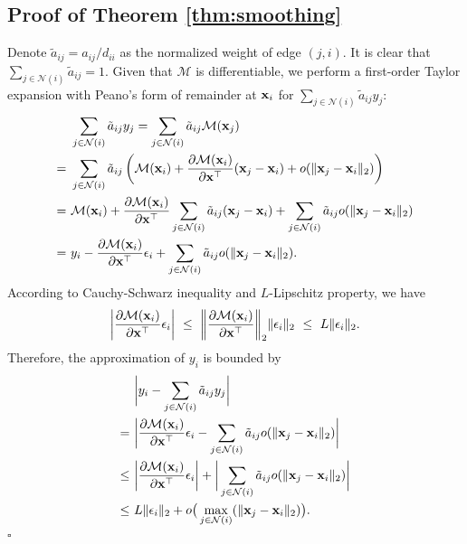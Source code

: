 \documentclass{article}
\newenvironment{proof}{{\noindent\it Proof.}\quad}{\hfill $\square$\par}
\begin{document}
	\subsection{Proof of Theorem \ref{thm:smoothing}}
	\label{app:a}
		\begin{proof}
			Denote $\tilde a_{ij} = a_{ij} / d_{ii}$ as the normalized weight of edge $(j, i)$.
			It is clear that $\sum_{j \in \mathcal N(i)} \tilde a_{ij} = 1$.
			Given that $\mathcal M$ is differentiable, we perform a first-order Taylor expansion with Peano's form of remainder at ${\bf x}_i$ for $\sum_{j \in \mathcal N(i)} \tilde a_{ij} y_j$:
			\begin{equation}
			\begin{split}
				& \sum_{j \in \mathcal N(i)} \tilde a_{ij} y_j = \sum_{j \in \mathcal N(i)} \tilde a_{ij} \mathcal M({\bf x}_j) \\
				= \ & \sum_{j \in \mathcal N(i)} \tilde a_{ij} \left( \mathcal M({\bf x}_i) + \frac{\partial \mathcal M({\bf x}_i)}{\partial {\bf x}^\top} ({\bf x}_j - {\bf x}_i) + o(\| {\bf x}_j - {\bf x}_i \|_2) \right) \\
				= \ & \mathcal M({\bf x}_i) + \frac{\partial \mathcal M({\bf x}_i)}{\partial {\bf x}^\top} \sum_{j \in \mathcal N(i)} \tilde a_{ij} ({\bf x}_j - {\bf x}_i) + \sum_{j \in \mathcal N(i)} \tilde a_{ij} o(\| {\bf x}_j - {\bf x}_i \|_2) \\
				= \ & y_i - \frac{\partial \mathcal M({\bf x}_i)}{\partial {\bf x}^\top} \epsilon_i + \sum_{j \in \mathcal N(i)} \tilde a_{ij} o(\| {\bf x}_j - {\bf x}_i \|_2).
			\end{split}
			\end{equation}
			According to Cauchy-Schwarz inequality and $L$-Lipschitz property, we have
			\begin{equation}
				\bigg| \frac{\partial \mathcal M({\bf x}_i)}{\partial {\bf x}^\top} \epsilon_i \bigg| \ \leq \ \bigg\| \frac{\partial \mathcal M({\bf x}_i)}{\partial {\bf x}^\top} \bigg\|_2 \| \epsilon_i \|_2 \ \leq \ L \| \epsilon_i \|_2.
			\end{equation}
			Therefore, the approximation of $y_i$ is bounded by
			\begin{equation}
			\begin{split}
				& \bigg| y_i - \sum_{j \in \mathcal N(i)} \tilde a_{ij} y_j \bigg| \\
				= \ & \bigg| \frac{\partial \mathcal M({\bf x}_i)}{\partial {\bf x}^\top} \epsilon_i - \sum_{j \in \mathcal N(i)} \tilde a_{ij} o(\| {\bf x}_j - {\bf x}_i \|_2) \bigg | \\
				\leq \ & \bigg| \frac{\partial \mathcal M({\bf x}_i)}{\partial {\bf x}^\top} \epsilon_i \bigg| + \bigg| \sum_{j \in \mathcal N(i)} \tilde a_{ij} o(\| {\bf x}_j - {\bf x}_i \|_2) \bigg | \\
				\leq \ & L \| \epsilon_i\|_2 + o \big( \max_{j \in \mathcal N(i)} ( \| {\bf x}_j - {\bf x}_i \|_2 ) \big).
			\end{split}
			\end{equation}
		\end{proof}
		
\end{document}

